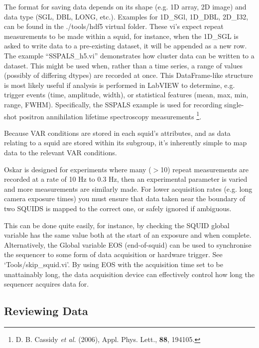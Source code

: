 \documentclass[10pt,a4paper]{article}
\newenvironment{warning}[1]{%
	\tcolorbox[beamer,%
	breakable,
	colback=white,colframe=DarkRed,%
	title=Warning:]}%
{\endtcolorbox}
\begin{document}
The format for saving data depends on its shape (e.g. 1D array, 2D image) and data type (SGL, DBL, LONG, etc.).  Examples for 1D\_SGl, 1D\_DBL, 2D\_I32, can be found in the ./tools/hdf5 virtual folder.  These vi's expect repeat measurements to be made within a squid, for instance, when the 1D\_SGL is asked to write data to a pre-existing dataset, it will be appended as a new row.  The example ``SSPALS\_h5.vi'' demonstrates how cluster data can be written to a dataset.  This might be used when, rather than a time series, a range of values (possibly of differing dtypes) are recorded at once.  This DataFrame-like structure is most likely useful if analysis is performed in LabVIEW to determine, e.g. trigger events (time, amplitude, width), or statistical features (mean, max, min, range, FWHM).  Specifically, the SSPALS example is used for recording single-shot positron annihilation lifetime spectroscopy measurements \footnote{D. B. Cassidy \emph{et al.} (2006), Appl. Phys. Lett., \textbf{88}, 194105.}.

Because VAR conditions are stored in each squid's attributes, and as data relating to a squid are stored within its subgroup, it's inherently simple to map data to the relevant VAR conditions.

\begin{warning}{}
	Oskar is designed for experiments where many ($>$10) repeat measurements are recorded at a rate of 10 Hz to 0.3 Hz, then an experimental parameter is varied and more measurements are similarly made.  For lower acquisition rates (e.g. long camera exposure times) you must ensure that data taken near the boundary of two SQUIDS is mapped to the correct one, or safely ignored if ambiguous.  
	
	This can be done quite easily, for instance, by checking the SQUID global variable has the same value both at the start of an exposure and when complete.  Alternatively, the Global variable EOS (end-of-squid) can be used to synchronise the sequencer to some form of data acquisition or hardware trigger.  See `Tools/skip\_squid.vi'.  By using EOS with the acquisition time set to be unattainably long, the data acquisition device can effectively control how long the sequencer acquires data for.
\end{warning}


\subsection{Reviewing Data}
\end{document}
